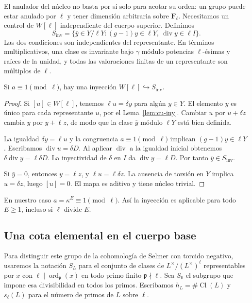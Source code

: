 El anulador del núcleo no basta por sí solo para acotar su orden: un grupo puede estar anulado por $\ell$ y tener dimensión arbitraria sobre $\mathbf F_\ell$. Necesitamos un control de $W[\ell]$ independiente del cuerpo superior. Definimos
\begin{equation}
 S_{\mathrm{inv}}=\{\bar y\in Y/\ell Y:
 (g-1)y\in\ell Y,\ \operatorname{div}y\in\ell I\}.
 \label{eq:cu-sinv}
\end{equation}
Las dos condiciones son independientes del representante. En términos multiplicativos, una clase es invariante bajo $\gamma$ módulo potencias $\ell$-ésimas y raíces de la unidad, y todas las valoraciones finitas de un representante son múltiplos de $\ell$.

\begin{proposicion}
\label{prop:cu-inj}
Si $a\equiv1\pmod\ell$, hay una inyección $W[\ell]\hookrightarrow S_{\mathrm{inv}}$.
\end{proposicion}
\begin{proof}
Si $[u]\in W[\ell]$, tenemos $\ell u=\delta y$ para algún $y\in Y$. El elemento $y$ es único para cada representante $u$, por el Lema~\ref{lem:cu-iny}. Cambiar $u$ por $u+\delta z$ cambia $y$ por $y+\ell z$, de modo que la clase $\bar y$ módulo $\ell Y$ está bien definida.

La igualdad $\delta y=\ell u$ y la congruencia $a\equiv1\pmod\ell$ implican $(g-1)y\in\ell Y$. Escribamos $\operatorname{div}u=\delta D$. Al aplicar $\operatorname{div}$ a la igualdad inicial obtenemos
$\delta\operatorname{div}y=\ell\delta D$. La inyectividad de $\delta$ en $I$ da $\operatorname{div}y=\ell D$. Por tanto $\bar y\in S_{\mathrm{inv}}$.

Si $\bar y=0$, entonces $y=\ell z$, y $\ell u=\ell\delta z$. La ausencia de torsión en $Y$ implica $u=\delta z$, luego $[u]=0$. El mapa es aditivo y tiene núcleo trivial.
\end{proof}

En nuestro caso $a=\kappa^E\equiv1\pmod\ell$. Así la inyección es aplicable para todo $E\ge1$, incluso si $\ell$ divide $E$.

\subsection{Una cota elemental en el cuerpo base}

Para distinguir este grupo de la cohomología de Selmer con torcido negativo, usaremos la notación $S_L$ para el conjunto de clases de $L^\times/(L^\times)^\ell$ representables por $x$ con $\ell\mid\operatorname{ord}_{\mathfrak p}(x)$ en todo primo finito $\mathfrak p\nmid\ell$. Sea $S_0$ el subgrupo que impone esa divisibilidad en todos los primos. Escribamos $h_L=\#\operatorname{Cl}(L)$ y $s_\ell(L)$ para el número de primos de $L$ sobre $\ell$.


